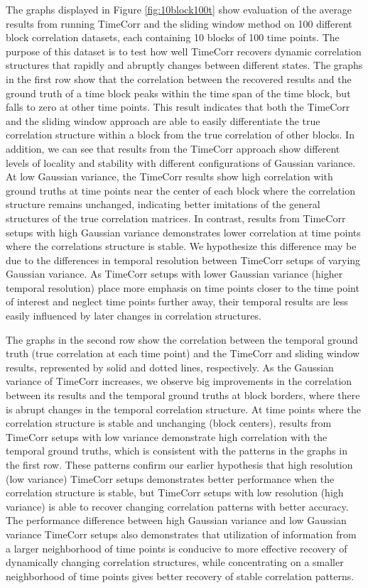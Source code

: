 \documentclass[11pt]{article}
\begin{document}
\begin{enumerate}
The graphs displayed in Figure \ref{fig:10block100t} show evaluation of the average results from running TimeCorr and the sliding window method on 100 different block correlation datasets, each containing 10 blocks of 100 time points. The purpose of this dataset is to test how well TimeCorr recovers dynamic correlation structures that rapidly and abruptly changes between different states. The graphs in the first row show that the correlation between the recovered results and the ground truth of a time block peaks within the time span of the time block, but falls to zero at other time points. This result indicates that both the TimeCorr and the sliding window approach are able to easily differentiate the true correlation structure within a block from the true correlation of other blocks. In addition, we can see that results from the TimeCorr approach show different levels of locality and stability with different configurations of Gaussian variance. At low Gaussian variance, the TimeCorr results show high correlation with ground truths at time points near the center of each block where the correlation structure remains unchanged, indicating better imitations of the general structures of the true correlation matrices. In contrast, results from TimeCorr setups with high Gaussian variance demonstrates lower correlation at time points where the correlations structure is stable. We hypothesize this difference may be due to the differences in temporal resolution between TimeCorr setups of varying Gaussian variance. As TimeCorr setups with lower Gaussian variance (higher temporal resolution) place more emphasis on time points closer to the time point of interest and neglect time points further away, their temporal results are less easily influenced by later changes in correlation structures.

The graphs in the second row show the correlation between the temporal ground truth (true correlation at each time point) and the TimeCorr and sliding window results, represented by solid and dotted lines, respectively. As the Gaussian variance of TimeCorr increases, we observe big improvements in the correlation between its results and the temporal ground truths at block borders, where there is abrupt changes in the temporal correlation structure. At time points where the correlation structure is stable and unchanging (block centers), results from TimeCorr setups with low variance demonstrate high correlation with the temporal ground truths, which is consistent with the patterns in the graphs in the first row. These patterns confirm our earlier hypothesis that high resolution (low variance) TimeCorr setups demonstrates better performance when the correlation structure is stable, but TimeCorr setups with low resolution (high variance) is able to recover changing correlation patterns with better accuracy. The performance difference between high Gaussian variance and low Gaussian variance TimeCorr setups also demonstrates that utilization of information from a larger neighborhood of time points is conducive to more effective recovery of dynamically changing correlation structures, while concentrating on a smaller neighborhood of time points gives better recovery of stable correlation patterns.


\end{enumerate}
\end{document}
